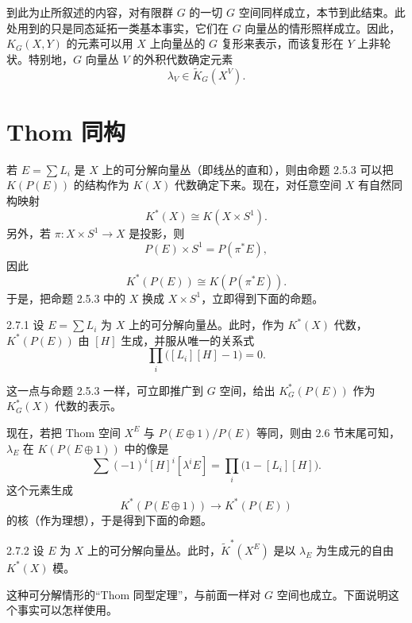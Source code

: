 到此为止所叙述的内容，对有限群 $G$ 的一切 $G$ 空间同样成立，本节到此结束。此处用到的只是同态延拓一类基本事实，它们在 $G$ 向量丛的情形照样成立。因此，$K_G(X,Y)$ 的元素可以用 $X$ 上向量丛的 $G$ 复形来表示，而该复形在 $Y$ 上非轮状。特别地，$G$ 向量丛 $V$ 的外积代数确定元素
\[
\lambda_V\in\tilde K_G(X^V).
\]

\section{Thom 同构}

若 $E=\sum L_i$ 是 $X$ 上的可分解向量丛（即线丛的直和），则由命题 2.5.3 可以把 $K(P(E))$ 的结构作为 $K(X)$ 代数确定下来。现在，对任意空间 $X$ 有自然同构映射
\[
K^*(X)\cong K(X\times S^1).
\]
另外，若 $\pi\colon X\times S^1\to X$ 是投影，则
\[
P(E)\times S^1=P(\pi^*E),
\]
因此
\[
K^*(P(E))\cong K(P(\pi^*E)).
\]
于是，把命题 2.5.3 中的 $X$ 换成 $X\times S^1$，立即得到下面的命题。

\begin{proposition*}{2.7.1}
  设 $E=\sum L_i$ 为 $X$ 上的可分解向量丛。此时，作为 $K^*(X)$ 代数，$K^*(P(E))$ 由 $[H]$ 生成，并服从唯一的关系式
  \[
  \prod_i\bigl([L_i][H]-1\bigr)=0.
  \]
\end{proposition*}

\begin{remark}{}
  这一点与命题 2.5.3 一样，可立即推广到 $G$ 空间，给出 $K_G^*(P(E))$ 作为 $K_G^*(X)$ 代数的表示。
\end{remark}

现在，若把 Thom 空间 $X^E$ 与 $P(E\oplus1)/P(E)$ 等同，则由 2.6 节末尾可知，$\lambda_E$ 在 $K(P(E\oplus1))$ 中的像是
\[
\sum(-1)^i[H]^i[\lambda^iE]=\prod_i\bigl(1-[L_i][H]\bigr).
\]
这个元素生成
\[
K^*(P(E\oplus1))\longrightarrow K^*(P(E))
\]
的核（作为理想），于是得到下面的命题。

\begin{proposition*}{2.7.2}
  设 $E$ 为 $X$ 上的可分解向量丛。此时，$\tilde K^*(X^E)$ 是以 $\lambda_E$ 为生成元的自由 $K^*(X)$ 模。
\end{proposition*}

\begin{remark}{}
  这种可分解情形的“Thom 同型定理”，与前面一样对 $G$ 空间也成立。下面说明这个事实可以怎样使用。
\end{remark}


